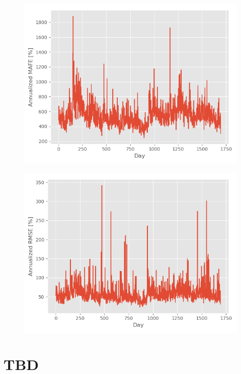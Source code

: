 \begin{figure}
\centering
\begin{minipage}{.5\textwidth}
  \centering
  \includegraphics[scale=0.5]{Plot/EvaluationMAFE.png}
  \label{MAFE}
\end{minipage}%
\begin{minipage}{.5\textwidth}
  \centering
  \includegraphics[scale=0.5]{Plot/EvaluationRMSE.png}
  \label{RMSE}
\end{minipage}
\end{figure}

\section{TBD}
